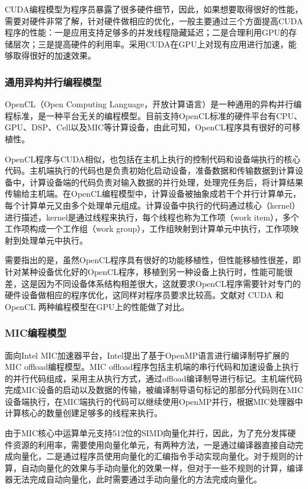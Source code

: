 CUDA编程模型为程序员暴露了很多硬件细节，因此，如果想要取得很好的性能，需要对硬件非常了解，针对硬件做相应的优化，一般主要通过三个方面提高CUDA程序的性能：一是应用支持足够多的并发线程隐藏延迟；二是合理利用GPU的存储层次；三是提高硬件的利用率。采用CUDA在GPU上对现有应用进行加速，能够取得很好的加速效果。

\subsubsection{通用异构并行编程模型}
OpenCL（Open Computing Language，开放计算语言）是一种通用的异构并行编程标准，是一种平台无关的编程模型。目前支持OpenCL标准的硬件平台有CPU、GPU、DSP、Cell以及MIC等计算设备，由此可知，OpenCL程序具有很好的可移植性。

OpenCL程序与CUDA相似，也包括在主机上执行的控制代码和设备端执行的核心代码。主机端执行的代码也是负责初始化启动设备，准备数据和传输数据到计算设备中，计算设备端的代码负责对输入数据的并行处理，处理完任务后，将计算结果传输给主机端。在OpenCL编程模型中，计算设备被抽象成若干个并行计算单元，每个计算单元又由多个处理单元组成。计算设备中执行的代码通过核心（kernel）进行描述，kernel是通过线程来执行，每个线程也称为工作项（work item），多个工作项构成一个工作组（work group），工作组映射到计算单元中执行，工作项映射到处理单元中执行。

需要指出的是，虽然OpenCL程序具有很好的功能移植性，但性能移植性很差，即针对某种设备优化好的OpenCL程序，移植到另一种设备上执行时，性能可能很差，这是因为不同设备体系结构相差很大，这就要求OpenCL程序需要针对专门的硬件设备做相应的程序优化，这同样对程序员要求比较高。文献对 CUDA 和 OpenCL 两种编程模型在GPU上的性能做了对比。

\subsubsection{MIC编程模型}
面向Intel MIC加速器平台，Intel提出了基于OpenMP语言进行编译制导扩展的MIC offload编程模型。MIC offload程序包括主机端的串行代码和加速设备上执行的并行代码组成，采用主从执行方式，通过offload编译制导进行标记。主机端代码完成MIC设备的启动以及数据的传输，被编译制导语句标记的那部分代码则在MIC设备端执行，在MIC端执行的代码可以继续使用OpenMP并行，根据MIC处理器中计算核心的数量创建足够多的线程来执行。

由于MIC核心中运算单元支持512位的SIMD向量化并行，因此，为了充分发挥硬件资源的利用率，需要使用向量化单元，有两种方法，一是通过编译器直接自动完成向量化，二是通过程序员使用向量化的汇编指令手动实现向量化。对于规则的计算，自动向量化的效果与手动向量化的效果一样，但对于一些不规则的计算，编译器无法完成自动向量化，此时需要通过手动向量化的方法完成向量化。

